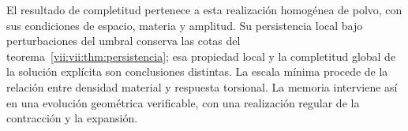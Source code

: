 El resultado de completitud pertenece a esta realización homogénea de
polvo, con sus condiciones de espacio, materia y amplitud. Su
persistencia local bajo perturbaciones del umbral conserva las cotas
del teorema~\ref{vii:vii:thm:persistencia}; esa propiedad local y la
completitud global de la solución explícita son conclusiones distintas.
La escala mínima procede de la relación entre densidad material y
respuesta torsional. La memoria interviene así en una evolución
geométrica verificable, con una realización regular de la contracción
y la expansión.
